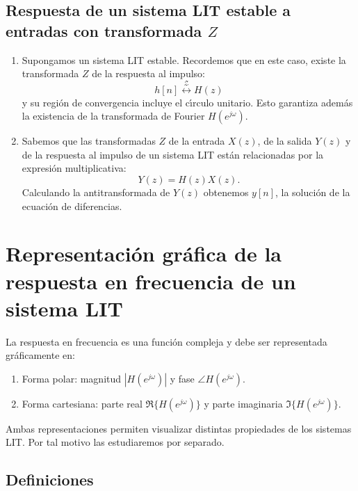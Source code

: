 \documentclass[11pt,a4paper,openany]{book}
\begin{document}
\subsection{Respuesta de un sistema LIT estable a entradas con transformada $Z$}

\begin{enumerate}
	
	\item Supongamos un sistema LIT estable. Recordemos que en este caso, existe la transformada $Z$ de la respuesta al impulso:
	\begin{equation}
		h[n] \stackrel{\mathcal{Z}}{\longleftrightarrow} H(z)
	\end{equation}
	y su regi\'{o}n de convergencia incluye el c\'{\i}rculo unitario. Esto garantiza adem\'{a}s la existencia de la transformada de Fourier $H(e^{j\omega})$.
	
	\item Sabemos que las transformadas $Z$ de la entrada $X(z)$, de la salida $Y(z)$ y de la respuesta al impulso de un sistema LIT est\'{a}n relacionadas por la expresi\'{o}n multiplicativa:
	\begin{equation}
		Y(z) = H(z) X(z).
	\end{equation}
	Calculando la antitransformada de $Y(z)$ obtenemos $y[n]$, la soluci\'{o}n de la ecuaci\'{o}n de diferencias.
	
\end{enumerate}

\section{Representaci\'{o}n gr\'{a}fica de la respuesta en frecuencia de un sistema LIT}

La respuesta en frecuencia es una funci\'{o}n compleja y debe ser representada gr\'{a}ficamente en:
\begin{enumerate}
	\item Forma polar: magnitud $|H(e^{j\omega})|$ y fase $\angle H(e^{j\omega})$.
	\item Forma cartesiana: parte real $\Re\{H(e^{j\omega})\}$ y parte imaginaria $\Im\{H(e^{j\omega})\}$.
\end{enumerate}

Ambas representaciones permiten visualizar distintas propiedades de los sistemas LIT. Por tal motivo las estudiaremos por separado.

\subsection{Definiciones}
\end{document}
